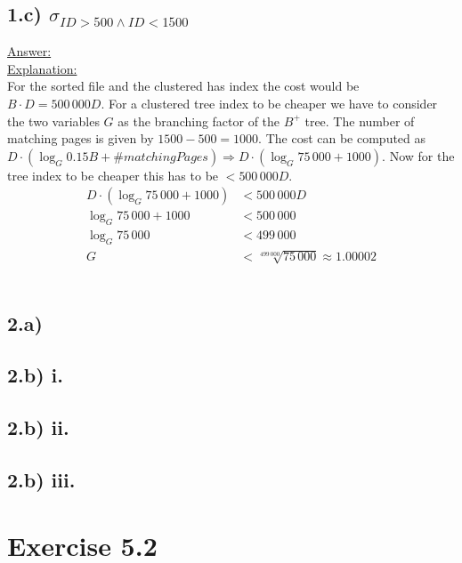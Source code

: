 \documentclass[12pt]{article}
\begin{document}
	\subsection*{1.c) $\sigma_{ID>500 \land ID<1500}$}
		\underline{Answer:} \\
		\underline{Explanation:} \\
			For the sorted file and the clustered has index the cost would be $B\cdot D = 500\,000D$. For a clustered tree index to be cheaper we have to consider the two variables $G$ as the branching factor of the $B^+$ tree. The number of matching pages is given by $1500-500=1000$. The cost can be computed as $D\cdot (\log_G 0.15B+\# matchingPages) \Rightarrow D\cdot (\log_G 75\,000 + 1000)$. Now for the tree index to be cheaper this has to be $< 500\,000D$.
			\begin{align*}
				D\cdot (\log_G 75\,000 + 1000) &< 500\,000D \\
				\log_G 75\,000 + 1000 &< 500\,000 \\
				\log_G 75\,000 &< 499\,000 \\
				G &< \sqrt[499\,000]{75\,000} \approx 1.00002
			\end{align*}\\
	
	\subsection*{2.a)}
	\subsection*{2.b) i.}
	\subsection*{2.b) ii.}
	\subsection*{2.b) iii.}
	\section*{Exercise 5.2}
\end{document}

